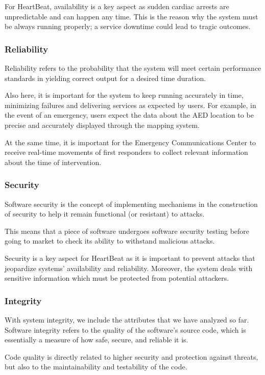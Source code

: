 \documentclass[11pt,a4paper]{article}
\begin{document}
For HeartBeat, availability is a key aspect as sudden cardiac arrests are unpredictable and can happen any time.
%
This is the reason why the system must be always running properly; a service downtime could lead to tragic outcomes.

\subsubsection{Reliability}
Reliability refers to the probability that the system will meet certain performance standards in yielding correct output for a desired time duration.

Also here, it is important for the system to keep running accurately in time, minimizing failures and delivering services as expected by users.
%
For example, in the event of an emergency, users expect the data about the AED location to be precise and accurately displayed through the mapping system.

At the same time, it is important for the Emergency Communications Center to receive real-time movements of first responders to collect relevant information about the time of intervention.

\subsubsection{Security}
Software security is the concept of implementing mechanisms in the construction of security to help it remain functional (or resistant) to attacks. 

This means that a piece of software undergoes software security testing before going to market to check its ability to withstand malicious attacks.

Security is a key aspect for HeartBeat as it is important to prevent attacks that jeopardize systems' availability and reliability.
%
Moreover, the system deals with sensitive information which must be protected from potential attackers.

\subsubsection{Integrity}
With system integrity, we include the attributes that we have analyzed so far.
%
Software integrity refers to the quality of the software’s source code, which is essentially a measure of how safe, secure, and reliable it is.

Code quality is directly related to higher security and protection against threats, but also to the maintainability and testability of the code. 
\end{document}
